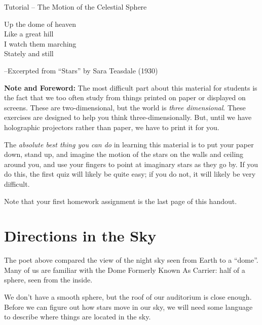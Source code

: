 \documentclass[12pt]{article}
\newcommand{\BS}{\bigskip}
\begin{document}
	\begin{center}\sc \Large Tutorial -- The Motion of the Celestial Sphere 
		

\small

	\it 

Up the dome of heaven \\
Like a great hill \\
I watch them marching \\ 
Stately and still \\


\BS

\begin{flushright} \rm --Excerpted from ``Stars'' by Sara Teasdale (1930) \end{flushright}

\end{center}

	\normalsize
	
	{\bf Note and Foreword:} The most difficult part about this material for students is the fact that we too often study from things printed on paper or displayed on screens. These are two-dimensional, but the world is {\it three dimensional}. These exercises are designed to help you think three-dimensionally. But, until we have holographic projectors rather than paper, we have to print it for you.
	
	The {\it absolute best thing you can do} in learning this material is to put your paper down, stand up, and imagine the motion of the stars on the walls and ceiling around you, and use your fingers to point at imaginary stars as they go by. If you do this, the first quiz will likely be quite easy; if you do not, it will likely be very difficult.
	
	Note that your first homework assignment is the last page of this handout.
	

	\section{Directions in the Sky}
	
	The poet above compared the view of the night sky seen from Earth to a ``dome''. Many of us are familiar with the Dome Formerly Known As Carrier: half of a sphere, seen from the inside.
	
	We don't have a smooth sphere, but the roof of our auditorium is close enough. Before we can figure out how stars move in our sky, we will need some language to describe where things are located in the sky. 
	
\end{document}
